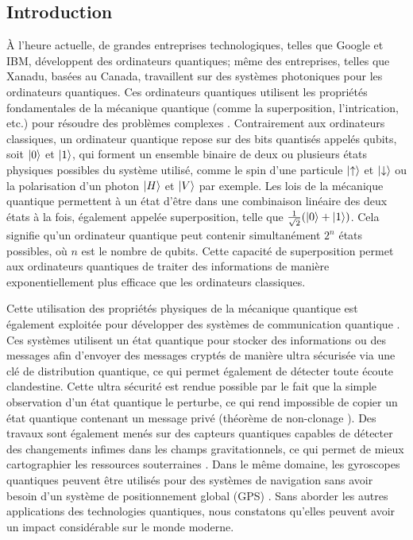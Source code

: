 \subsection{Introduction}

\begin{onehalfspace}

    À l'heure actuelle, de grandes entreprises technologiques, telles que 
    Google et IBM, développent des ordinateurs quantiques; même des 
    entreprises, telles que Xanadu, basées au Canada, travaillent sur 
    des systèmes photoniques pour les ordinateurs quantiques. Ces 
    ordinateurs quantiques utilisent les propriétés fondamentales de la 
    mécanique quantique (comme la superposition, l'intrication, etc.) 
    pour résoudre des problèmes complexes \cite{Feynman1982,quantumcomputing40years}. 
    Contrairement aux ordinateurs classiques, un ordinateur quantique 
    repose sur des bits quantisés appelés qubits, soit $\ket{0}$ et $\ket{1}$,
    qui forment un ensemble binaire de deux ou plusieurs états physiques possibles du système utilisé, comme le spin d'une particule $\ket{\uparrow}$ et $\ket{\downarrow}$ ou
    la polarisation d'un photon $\ket{H}$ et $\ket{V}$ par exemple. Les lois de 
    la mécanique quantique permettent à un état d'être dans une combinaison 
    linéaire des deux états à la fois, également appelée superposition, 
    telle que $\frac{1}{\sqrt{2}}(\ket{0}+\ket{1})$. Cela signifie 
    qu’un ordinateur quantique 
    peut contenir simultanément $2^n$ états possibles, où $n$ est le nombre de qubits.
    Cette capacité de superposition permet aux ordinateurs quantiques de
    traiter des informations de manière exponentiellement plus efficace que les ordinateurs classiques.
    
    \noindent Cette utilisation 
    des propriétés physiques de la mécanique quantique est également 
    exploitée pour développer des systèmes de communication quantique \cite{QTintelecomindustry}. 
    Ces systèmes utilisent un état quantique pour stocker des informations 
    ou des messages afin d'envoyer des messages cryptés de manière ultra 
    sécurisée via une clé de distribution quantique, ce qui permet 
    également de détecter toute écoute clandestine. Cette ultra sécurité
    est rendue possible par le fait que la simple observation d’un état
    quantique le perturbe, ce qui rend impossible de copier un état
    quantique contenant un message privé (théorème de non-clonage \cite{Wootters1982}). Des travaux sont
    également menés sur des capteurs quantiques capables de détecter des
    changements infimes dans les champs gravitationnels, ce qui permet
    de mieux cartographier les ressources souterraines \cite{metrology}.
    Dans le même
    domaine, les gyroscopes quantiques peuvent être utilisés pour des
    systèmes de navigation sans avoir besoin d'un système de 
    positionnement global (GPS) \cite{QTapplImpl}. Sans aborder les 
    autres applications des 
    technologies quantiques, nous constatons qu'elles peuvent avoir un 
    impact considérable sur le monde moderne. 


\end{onehalfspace}
